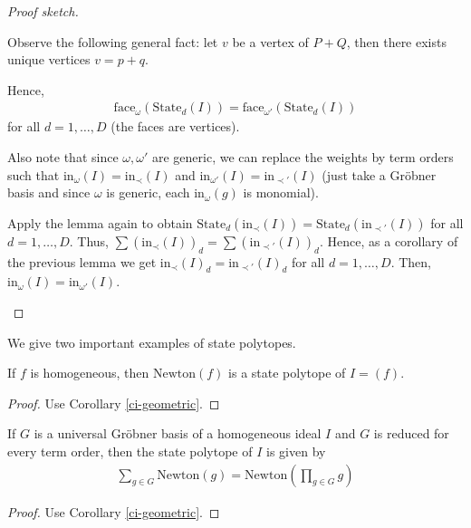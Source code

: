 \documentclass[a4paper, 11pt]{article}
\begin{document}
\begin{proof}[Proof sketch]
\begin{itemize}
    Observe the following general fact: let \( v \) be a vertex of \( P + Q \), then there exists unique vertices \( v = p + q \). 
    
    Hence,
    \begin{align*}
      \mathrm{face}_\omega(\mathrm{State}_d(I)) = \mathrm{face}_{\omega'}(\mathrm{State}_d(I))
    \end{align*}
    for all \( d = 1, \dots, D \) (the faces are vertices).
    
    Also note that since \( \omega, \omega' \) are generic, we can replace the weights by term orders such that \( \mathrm{in}_\omega(I) = \mathrm{in}_\prec(I) \) and \( \mathrm{in}_{\omega'}(I) = \mathrm{in}_{\prec'}(I) \) (just take a Gröbner basis and since \( \omega \) is generic, each \( \mathrm{in}_\omega(g) \) is monomial).  

    Apply the lemma again to obtain \( \mathrm{State}_d(\mathrm{in}_\prec(I)) = \mathrm{State}_d(\mathrm{in}_{\prec'}(I)) \) for all \( d = 1, \dots, D \). Thus, \(  \sum (\mathrm{in}_\prec(I))_d  =  \sum (\mathrm{in}_{\prec'}(I))_d   \). Hence, as a corollary of the previous lemma we get \( \mathrm{in}_\prec(I)_d = \mathrm{in}_{\prec'}(I)_d \) for all \( d = 1, \dots, D \). Then, \( \mathrm{in}_\omega(I) = \mathrm{in}_{\omega'} (I)\).
  \end{itemize}
\end{proof}


We give two important examples of state polytopes.

\begin{prop}
  If \( f \) is homogeneous, then \( \mathrm{Newton}(f) \) is a state polytope of \( I = (f) \).
\end{prop}

\begin{proof}
  Use Corollary \ref{ci-geometric}.
\end{proof}


\begin{cor}
If \( G \) is a universal Gröbner basis of a homogeneous ideal \( I \) and \( G \) is reduced for every term order, then the state polytope of \( I \) is given by 
\begin{align*}
  \sum_{g \in G} \mathrm{Newton}(g) = \mathrm{Newton}(\prod_{g \in G} g)
\end{align*}
\end{cor}
\begin{proof}
  Use Corollary \ref{ci-geometric}.
\end{proof}
\end{document}

